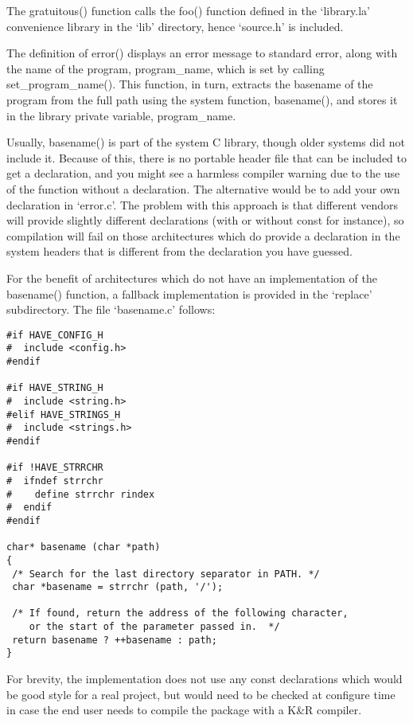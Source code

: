 The gratuitous() function calls the foo() function defined in the `library.la' convenience library in the `lib' directory, hence `source.h' is included. 


The definition of error() displays an error message to standard error, along with the name of the program, program\_{}name, which is set by calling set\_{}program\_{}name(). This function, in turn, extracts the basename of the program from the full path using the system function, basename(), and stores it in the library private variable, program\_{}name. 


Usually, basename() is part of the system C library, though older systems did not include it. Because of this, there is no portable header file that can be included to get a declaration, and you might see a harmless compiler warning due to the use of the function without a declaration. The alternative would be to add your own declaration in `error.c'. The problem with this approach is that different vendors will provide slightly different declarations (with or without const for instance), so compilation will fail on those architectures which do provide a declaration in the system headers that is different from the declaration you have guessed. 


For the benefit of architectures which do not have an implementation of the basename() function, a fallback implementation is provided in the `replace' subdirectory. The file `basename.c' follows: 

\begin{Verbatim}[frame=single]
#if HAVE_CONFIG_H
#  include <config.h>
#endif

#if HAVE_STRING_H
#  include <string.h>
#elif HAVE_STRINGS_H
#  include <strings.h>
#endif

#if !HAVE_STRRCHR
#  ifndef strrchr
#    define strrchr rindex
#  endif
#endif

char* basename (char *path)
{
 /* Search for the last directory separator in PATH. */
 char *basename = strrchr (path, '/');
  
 /* If found, return the address of the following character,
    or the start of the parameter passed in.  */
 return basename ? ++basename : path;
}

\end{Verbatim}

For brevity, the implementation does not use any const declarations which 
would be good style for a real project, but would need to be checked at 
configure time in case the end user needs to compile the package with a K\&R
compiler. 


